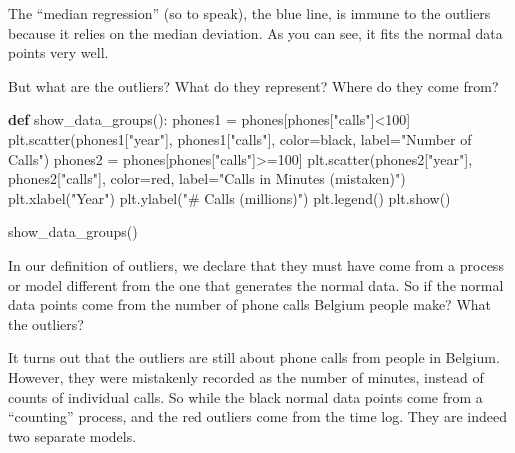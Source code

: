 \documentclass[
  letterpaper,
]{scrbook}
\newenvironment{Shaded}{\begin{snugshade}}{\end{snugshade}}
\newcommand{\DecValTok}[1]{\textcolor[rgb]{0.68,0.00,0.00}{#1}}
\newcommand{\KeywordTok}[1]{\textcolor[rgb]{0.00,0.23,0.31}{\textbf{#1}}}
\newcommand{\NormalTok}[1]{\textcolor[rgb]{0.00,0.23,0.31}{#1}}
\newcommand{\OperatorTok}[1]{\textcolor[rgb]{0.37,0.37,0.37}{#1}}
\newcommand{\StringTok}[1]{\textcolor[rgb]{0.13,0.47,0.30}{#1}}
\begin{document}
The ``median regression'' (so to speak), the blue line, is immune to the
outliers because it relies on the median deviation. As you can see, it
fits the normal data points very well.

But what are the outliers? What do they represent? Where do they come
from?

\begin{Shaded}
\begin{Highlighting}[]
\KeywordTok{def}\NormalTok{ show\_data\_groups():}
\NormalTok{    phones1 }\OperatorTok{=}\NormalTok{ phones[phones[}\StringTok{"calls"}\NormalTok{]}\OperatorTok{\textless{}}\DecValTok{100}\NormalTok{]}
\NormalTok{    plt.scatter(phones1[}\StringTok{"year"}\NormalTok{], phones1[}\StringTok{"calls"}\NormalTok{],  color}\OperatorTok{=}\StringTok{\textquotesingle{}black\textquotesingle{}}\NormalTok{, label}\OperatorTok{=}\StringTok{"Number of Calls"}\NormalTok{)}
\NormalTok{    phones2 }\OperatorTok{=}\NormalTok{ phones[phones[}\StringTok{"calls"}\NormalTok{]}\OperatorTok{\textgreater{}=}\DecValTok{100}\NormalTok{]}
\NormalTok{    plt.scatter(phones2[}\StringTok{"year"}\NormalTok{], phones2[}\StringTok{"calls"}\NormalTok{],  color}\OperatorTok{=}\StringTok{\textquotesingle{}red\textquotesingle{}}\NormalTok{, label}\OperatorTok{=}\StringTok{"Calls in Minutes (mistaken)"}\NormalTok{)}
\NormalTok{    plt.xlabel(}\StringTok{"Year"}\NormalTok{)}
\NormalTok{    plt.ylabel(}\StringTok{"\# Calls (millions)"}\NormalTok{)}
\NormalTok{    plt.legend()}
\NormalTok{    plt.show()}
\end{Highlighting}
\end{Shaded}

\begin{Shaded}
\begin{Highlighting}[]
\NormalTok{show\_data\_groups()}
\end{Highlighting}
\end{Shaded}

In our definition of outliers, we declare that they must have come from
a process or model different from the one that generates the normal
data. So if the normal data points come from the number of phone calls
Belgium people make? What the outliers?

It turns out that the outliers are still about phone calls from people
in Belgium. However, they were mistakenly recorded as the number of
minutes, instead of counts of individual calls. So while the black
normal data points come from a ``counting'' process, and the red
outliers come from the time log. They are indeed two separate models.
\end{document}
